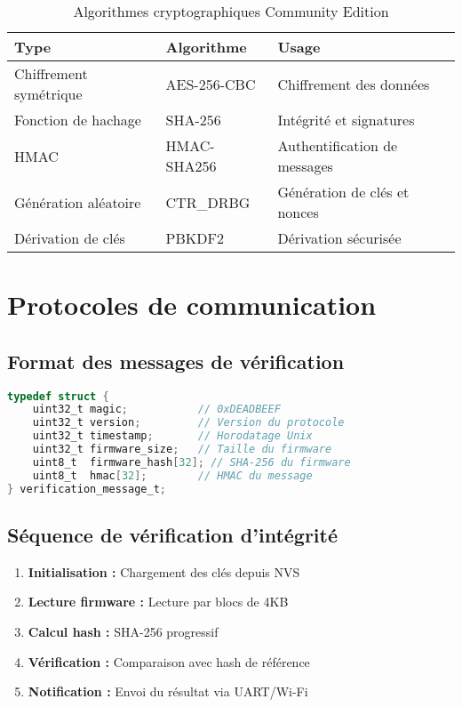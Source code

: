 \begin{table}[h!]
\centering
\caption{Algorithmes cryptographiques Community Edition}
\begin{tabular}{@{}lll@{}}
\toprule
\textbf{Type} & \textbf{Algorithme} & \textbf{Usage} \\
\midrule
Chiffrement symétrique & AES-256-CBC & Chiffrement des données \\
Fonction de hachage & SHA-256 & Intégrité et signatures \\
HMAC & HMAC-SHA256 & Authentification de messages \\
Génération aléatoire & CTR\_DRBG & Génération de clés et nonces \\
Dérivation de clés & PBKDF2 & Dérivation sécurisée \\
\bottomrule
\end{tabular}
\end{table}

\section{Protocoles de communication}

\subsection{Format des messages de vérification}

\begin{lstlisting}[language=C, caption=Structure message de vérification]
typedef struct {
    uint32_t magic;           // 0xDEADBEEF
    uint32_t version;         // Version du protocole
    uint32_t timestamp;       // Horodatage Unix
    uint32_t firmware_size;   // Taille du firmware
    uint8_t  firmware_hash[32]; // SHA-256 du firmware
    uint8_t  hmac[32];        // HMAC du message
} verification_message_t;
\end{lstlisting}

\subsection{Séquence de vérification d'intégrité}

\begin{enumerate}
    \item \textbf{Initialisation :} Chargement des clés depuis NVS
    \item \textbf{Lecture firmware :} Lecture par blocs de 4KB
    \item \textbf{Calcul hash :} SHA-256 progressif
    \item \textbf{Vérification :} Comparaison avec hash de référence
    \item \textbf{Notification :} Envoi du résultat via UART/Wi-Fi
\end{enumerate}

